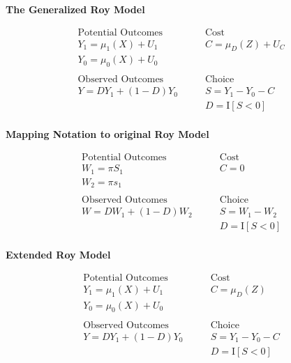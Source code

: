\begin{frame}
\textbf{The Generalized Roy Model}

\begin{align}
\text{Potential Outcomes} &\qquad \text{Cost} \\
Y_1 = \mu_1(X) + U_1      &\qquad C = \mu_D(Z) + U_C \\
Y_0 = \mu_0(X) + U_0      &\qquad \\
    & \\
\text{Observed Outcomes } &\qquad \text{Choice} \\
Y = D Y_1 + (1 - D)Y_0 &\qquad S = Y_1 - Y_0 - C \\
                       &\qquad D = \mathrm{I}[S < 0] \\
\end{align}
\end{frame}


\begin{frame}
\textbf{Mapping Notation to original Roy Model}

\begin{align}
\text{Potential Outcomes} &\qquad \text{Cost} \\
W_1 = \pi S_1      &\qquad C = 0 \\
W_2 = \pi s_1       &\qquad \\
    & \\
\text{Observed Outcomes } &\qquad \text{Choice} \\
W = D W_1 + (1 - D)W_2 &\qquad S = W_1 - W_2 \\
                       &\qquad D = \mathrm{I}[S < 0] \\
\end{align}
\end{frame}


\begin{frame}
\textbf{Extended Roy Model}

\begin{align}
\text{Potential Outcomes} &\qquad \text{Cost} \\
Y_1 = \mu_1(X) + U_1      &\qquad C = \mu_D(Z) \\
Y_0 = \mu_0(X) + U_0      &\qquad \\
    & \\
\text{Observed Outcomes } &\qquad \text{Choice} \\
Y = D Y_1 + (1 - D)Y_0 &\qquad S = Y_1 - Y_0 - C \\
                       &\qquad D = \mathrm{I}[S < 0] \\
\end{align}

\end{frame}



